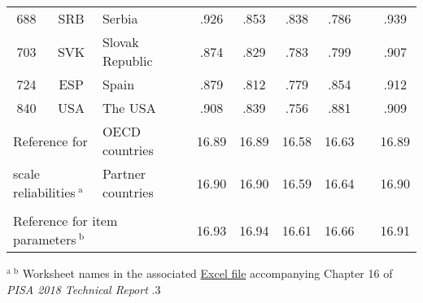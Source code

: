 {\begin{tabular}{ccl c@{\hskip 1cm} cccc c@{\hskip 1cm} c}
    688   & SRB   & Serbia &       & .926 & .853 & .838 & .786 &       & .939 \\
    703   & SVK   & Slovak Republic &       & .874 & .829 & .783 & .799 &       & .907 \\
    724   & ESP   & Spain &       & .879 & .812 & .779 & .854 &       & .912 \\
    840   & USA   & The USA &       & .908 & .839 & .756 & .881 &       & .909 \\
    \midrule
    \multicolumn{2}{l}{Reference for} & \multicolumn{1}{l}{OECD countries} & & \textsf{16.89} & \textsf{16.89} & \textsf{16.58} & \textsf{16.63} &       & \textsf{16.89} \\
    \multicolumn{2}{l}{scale reliabilities$\ ^\text{a}$} & \multicolumn{1}{l}{Partner countries} & & \textsf{16.90} & \textsf{16.90} & \textsf{16.59} & \textsf{16.64} &       & \textsf{16.90} \\
    &&&&&&&&&\\
    \multicolumn{3}{l}{Reference for item parameters$\ ^\text{b}$} & & \textsf{16.93} & \textsf{16.94} & \textsf{16.61} & \textsf{16.66} & & \textsf{16.91}\\
    \bottomrule
    \end{tabular}
}{$^\text{a}\ ^\text{b}$ Worksheet names in the associated \href{https://www.oecd.org/pisa/data/pisa2018technicalreport/PISA2018_Technical_Report_chapter-16_Background_Questionnaires.xlsx}{Excel file} accompanying Chapter 16 of \textit{PISA 2018 Technical Report} \parencite{PISAtech}.}{3}
